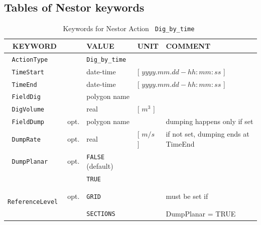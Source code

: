 \subsection{Tables of Nestor keywords} \label{ssec:E1KeyTabl}
%
\begin{table}[ht]
\centering
\caption{ Keywords for Nestor Action \texttt{~Dig\_by\_time~}}
\begin{tabular}{| l | l | l | l | p{4.7cm} |}
\hline
{\textcolor{white}{\LARGE |}} \textbf{KEYWORD}        &     &\textbf{VALUE}         &\textbf{UNIT}          &\textbf{COMMENT}     \\ \hline
{\textcolor{white}{\LARGE |}} \texttt{ActionType}     &     &\texttt{Dig\_by\_time} &                       &                     \\ \hline
{\textcolor{white}{\LARGE |}} \texttt{TimeStart}      &     &date-time              &\multicolumn{2}{l|}{[ $yyyy.mm.dd-hh:mm:ss$ ]} \\ \hline
{\textcolor{white}{\LARGE |}} \texttt{TimeEnd}        &     &date-time              &\multicolumn{2}{l|}{[ $yyyy.mm.dd-hh:mm:ss$ ]} \\ \hline
{\textcolor{white}{\LARGE |}} \texttt{FieldDig}       &     &polygon name           &                       &                     \\ \hline
{\textcolor{white}{\LARGE |}} \texttt{DigVolume}      &     &real                   &[ $m^3$ ]              &                     \\ \hline
{\textcolor{white}{\LARGE |}} \texttt{FieldDump}      &opt. &polygon name           &                       &dumping happens only if set \\ \hline
{\textcolor{white}{\LARGE |}} \texttt{DumpRate}       &opt. &real                   &[ $m/s$ ]                &if not set, dumping ends at TimeEnd \\ \hline
{\textcolor{white}{\LARGE |}} \texttt{DumpPlanar}     &opt. &\texttt{FALSE} (\small{default}) &             &                     \\
{\textcolor{white}{\LARGE |}}                         &     &\texttt{TRUE}                    &             &                     \\ \hline
{\textcolor{white}{\LARGE |}} \texttt{ReferenceLevel} &opt. &\texttt{GRID}          &                       &must be set if       \\
{\textcolor{white}{\LARGE |}}                         &     &\texttt{SECTIONS}      &                       &DumpPlanar = TRUE    \\

\end{tabular}
\end{table}
